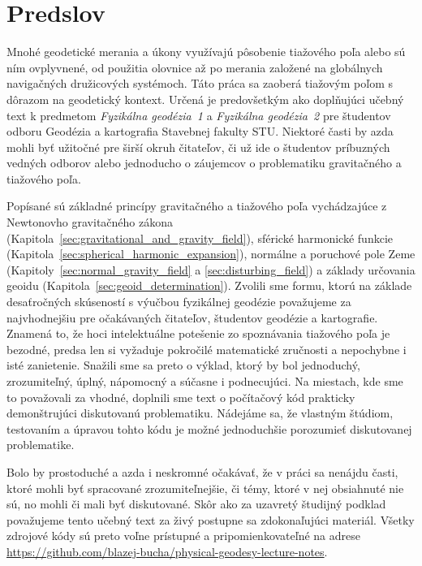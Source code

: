 \documentclass[a4paper, 12pt]{book}
\begin{document}

\chapter*{Predslov}

Mnohé geodetické merania a úkony využívajú pôsobenie tiažového poľa alebo sú 
ním ovplyvnené, od použitia olovnice až po merania založené na globálnych 
navigačných družicových systémoch.  Táto práca sa zaoberá tiažovým poľom 
s dôrazom na geodetický kontext.  Určená je predovšetkým ako doplňujúci učebný 
text k predmetom \emph{Fyzikálna geodézia~1} a \emph{Fyzikálna geodézia~2} pre 
študentov odboru Geodézia a kartografia Stavebnej fakulty STU.  Niektoré časti 
by azda mohli byť užitočné pre širší okruh čitateľov, či už ide o študentov 
príbuzných vedných odborov alebo jednoducho o záujemcov o problematiku 
gravitačného a tiažového poľa.

Popísané sú základné princípy gravitačného a tiažového poľa vychádzajúce 
z Newtonovho gravitačného zákona 
(Kapitola~\ref{sec:gravitational_and_gravity_field}), sférické harmonické 
funkcie (Kapitola~\ref{sec:spherical_harmonic_expansion}), normálne a poruchové 
pole Zeme (Kapitoly~\ref{sec:normal_gravity_field} 
a \ref{sec:disturbing_field}) a základy určovania geoidu 
(Kapitola~\ref{sec:geoid_determination}).  Zvolili sme formu, ktorú na základe 
desaťročných skúseností s výučbou fyzikálnej geodézie považujeme za 
najvhodnejšiu pre očakávaných čitateľov, študentov geodézie a kartografie.  
Znamená to, že hoci intelektuálne potešenie zo spoznávania tiažového poľa je 
bezodné, predsa len si vyžaduje pokročilé matematické zručnosti a nepochybne 
i isté zanietenie.  Snažili sme sa preto o výklad, ktorý by bol jednoduchý, 
zrozumiteľný, úplný, nápomocný a súčasne i podnecujúci.  Na miestach, kde sme 
to považovali za vhodné, doplnili sme text o počítačový kód prakticky 
demonštrujúci diskutovanú problematiku.  Nádejáme sa, že vlastným štúdiom, 
testovaním a úpravou tohto kódu je možné jednoduchšie porozumieť diskutovanej 
problematike.

Bolo by prostoduché a azda i neskromné očakávať, že v práci sa nenájdu časti, 
ktoré mohli byť spracované zrozumiteľnejšie, či témy, ktoré v nej obsiahnuté 
nie sú, no mohli či mali byť diskutované.  Skôr ako za uzavretý študijný 
podklad považujeme tento učebný text za živý postupne sa zdokonaľujúci 
materiál.  Všetky zdrojové kódy sú preto voľne prístupné a pripomienkovateľné 
na adrese \url{https://github.com/blazej-bucha/physical-geodesy-lecture-notes}.
\end{document}
